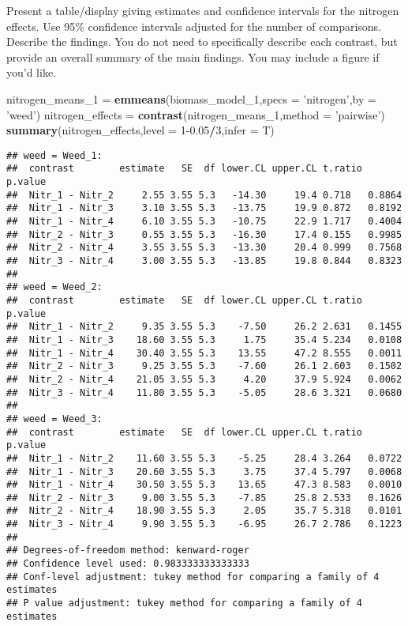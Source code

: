 \documentclass[
]{article}
\newenvironment{Shaded}{\begin{snugshade}}{\end{snugshade}}
\newcommand{\DataTypeTok}[1]{\textcolor[rgb]{0.13,0.29,0.53}{#1}}
\newcommand{\DecValTok}[1]{\textcolor[rgb]{0.00,0.00,0.81}{#1}}
\newcommand{\FloatTok}[1]{\textcolor[rgb]{0.00,0.00,0.81}{#1}}
\newcommand{\KeywordTok}[1]{\textcolor[rgb]{0.13,0.29,0.53}{\textbf{#1}}}
\newcommand{\NormalTok}[1]{#1}
\newcommand{\OperatorTok}[1]{\textcolor[rgb]{0.81,0.36,0.00}{\textbf{#1}}}
\newcommand{\StringTok}[1]{\textcolor[rgb]{0.31,0.60,0.02}{#1}}
\begin{document}
Present a table/display giving estimates and confidence intervals for
the nitrogen effects. Use 95\% confidence intervals adjusted for the
number of comparisons. Describe the findings. You do not need to
specifically describe each contrast, but provide an overall summary of
the main findings. You may include a figure if you'd like.

\begin{Shaded}
\begin{Highlighting}[]
\NormalTok{nitrogen_means_}\DecValTok{1}\NormalTok{ =}\StringTok{ }\KeywordTok{emmeans}\NormalTok{(biomass_model_}\DecValTok{1}\NormalTok{,}\DataTypeTok{specs =} \StringTok{'nitrogen'}\NormalTok{,}\DataTypeTok{by =} \StringTok{'weed'}\NormalTok{)}
\NormalTok{nitrogen_effects =}\StringTok{ }\KeywordTok{contrast}\NormalTok{(nitrogen_means_}\DecValTok{1}\NormalTok{,}\DataTypeTok{method =} \StringTok{'pairwise'}\NormalTok{)}
\KeywordTok{summary}\NormalTok{(nitrogen_effects,}\DataTypeTok{level =} \DecValTok{1}\FloatTok{-0.05}\OperatorTok{/}\DecValTok{3}\NormalTok{,}\DataTypeTok{infer =}\NormalTok{ T)}
\end{Highlighting}
\end{Shaded}

\begin{verbatim}
## weed = Weed_1:
##  contrast        estimate   SE  df lower.CL upper.CL t.ratio p.value
##  Nitr_1 - Nitr_2     2.55 3.55 5.3   -14.30     19.4 0.718   0.8864 
##  Nitr_1 - Nitr_3     3.10 3.55 5.3   -13.75     19.9 0.872   0.8192 
##  Nitr_1 - Nitr_4     6.10 3.55 5.3   -10.75     22.9 1.717   0.4004 
##  Nitr_2 - Nitr_3     0.55 3.55 5.3   -16.30     17.4 0.155   0.9985 
##  Nitr_2 - Nitr_4     3.55 3.55 5.3   -13.30     20.4 0.999   0.7568 
##  Nitr_3 - Nitr_4     3.00 3.55 5.3   -13.85     19.8 0.844   0.8323 
## 
## weed = Weed_2:
##  contrast        estimate   SE  df lower.CL upper.CL t.ratio p.value
##  Nitr_1 - Nitr_2     9.35 3.55 5.3    -7.50     26.2 2.631   0.1455 
##  Nitr_1 - Nitr_3    18.60 3.55 5.3     1.75     35.4 5.234   0.0108 
##  Nitr_1 - Nitr_4    30.40 3.55 5.3    13.55     47.2 8.555   0.0011 
##  Nitr_2 - Nitr_3     9.25 3.55 5.3    -7.60     26.1 2.603   0.1502 
##  Nitr_2 - Nitr_4    21.05 3.55 5.3     4.20     37.9 5.924   0.0062 
##  Nitr_3 - Nitr_4    11.80 3.55 5.3    -5.05     28.6 3.321   0.0680 
## 
## weed = Weed_3:
##  contrast        estimate   SE  df lower.CL upper.CL t.ratio p.value
##  Nitr_1 - Nitr_2    11.60 3.55 5.3    -5.25     28.4 3.264   0.0722 
##  Nitr_1 - Nitr_3    20.60 3.55 5.3     3.75     37.4 5.797   0.0068 
##  Nitr_1 - Nitr_4    30.50 3.55 5.3    13.65     47.3 8.583   0.0010 
##  Nitr_2 - Nitr_3     9.00 3.55 5.3    -7.85     25.8 2.533   0.1626 
##  Nitr_2 - Nitr_4    18.90 3.55 5.3     2.05     35.7 5.318   0.0101 
##  Nitr_3 - Nitr_4     9.90 3.55 5.3    -6.95     26.7 2.786   0.1223 
## 
## Degrees-of-freedom method: kenward-roger 
## Confidence level used: 0.983333333333333 
## Conf-level adjustment: tukey method for comparing a family of 4 estimates 
## P value adjustment: tukey method for comparing a family of 4 estimates
\end{verbatim}
\end{document}
